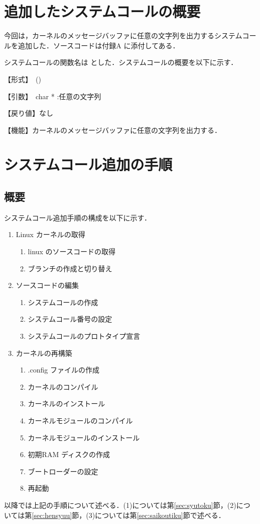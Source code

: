 \documentclass[12pt]{jsarticle}
\begin{document}
\section{追加したシステムコールの概要}\label{sec:gaiyou}
今回は，カーネルのメッセージバッファに任意の文字列を出力するシステムコールを追加した．ソースコードは付録A に添付してある．

システムコールの関数名は とした．システムコールの概要を以下に示す．

【形式】　()

【引数】　char * :任意の文字列

【戻り値】なし

【機能】カーネルのメッセージバッファに任意の文字列を出力する．

\section{システムコール追加の手順}\label{sec:tejun}
 \subsection{概要}
システムコール追加手順の構成を以下に示す．
\begin{enumerate}
\item Linux カーネルの取得
  \begin{enumerate}
  \item linux のソースコードの取得
  \item ブランチの作成と切り替え
  \end{enumerate}
\item ソースコードの編集
  \begin{enumerate}
  \item システムコールの作成
  \item システムコール番号の設定
  \item システムコールのプロトタイプ宣言
  \end{enumerate}
\item カーネルの再構築
  \begin{enumerate}
  \item .config ファイルの作成
  \item カーネルのコンパイル
  \item カーネルのインストール
  \item カーネルモジュールのコンパイル
  \item カーネルモジュールのインストール
  \item 初期RAM ディスクの作成
  \item ブートローダーの設定
  \item 再起動
  \end{enumerate}
\end{enumerate}
以降では上記の手順について述べる．(1)については第\ref{sec:syutoku}節，(2)については第\ref{sec:hensyuu}節，(3)については第\ref{sec:saikoutiku}節で述べる．
\end{document}
